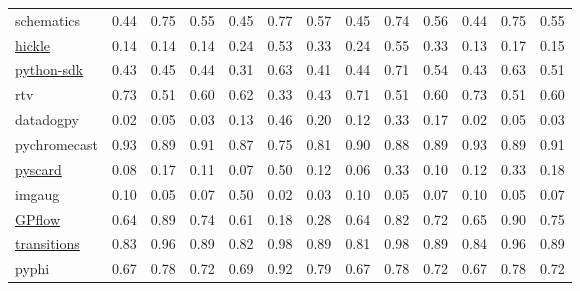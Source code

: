 \documentclass[submit]{ipsj}
\begin{document}
\begin{table}[t]
{\begin{tabular}{lcccccccccccc}
        schematics & 0.44 & 0.75 & 0.55 & 0.45 & 0.77 & 0.57 & 0.45 & 0.74 & 0.56 & 0.44 & 0.75 & 0.55 \\
        \underline{hickle} & 0.14 & 0.14 & 0.14 & 0.24 & 0.53 & 0.33 & 0.24 & 0.55 & 0.33 & 0.13 & 0.17 & 0.15 \\
        \underline{python-sdk} & 0.43 & 0.45 & 0.44 & 0.31 & 0.63 & 0.41 & 0.44 & 0.71 & 0.54 & 0.43 & 0.63 & 0.51 \\
        rtv & 0.73 & 0.51 & 0.60 & 0.62 & 0.33 & 0.43 & 0.71 & 0.51 & 0.60 & 0.73 & 0.51 & 0.60 \\
        datadogpy & 0.02 & 0.05 & 0.03 & 0.13 & 0.46 & 0.20 & 0.12 & 0.33 & 0.17 & 0.02 & 0.05 & 0.03 \\
        pychromecast & 0.93 & 0.89 & 0.91 & 0.87 & 0.75 & 0.81 & 0.90 & 0.88 & 0.89 & 0.93 & 0.89 & 0.91 \\
        \underline{pyscard} & 0.08 & 0.17 & 0.11 & 0.07 & 0.50 & 0.12 & 0.06 & 0.33 & 0.10 & 0.12 & 0.33 & 0.18 \\
        imgaug & 0.10 & 0.05 & 0.07 & 0.50 & 0.02 & 0.03 & 0.10 & 0.05 & 0.07 & 0.10 & 0.05 & 0.07 \\
        \underline{GPflow} & 0.64 & 0.89 & 0.74 & 0.61 & 0.18 & 0.28 & 0.64 & 0.82 & 0.72 & 0.65 & 0.90 & 0.75 \\
        \underline{transitions} & 0.83 & 0.96 & 0.89 & 0.82 & 0.98 & 0.89 & 0.81 & 0.98 & 0.89 & 0.84 & 0.96 & 0.89 \\
        pyphi & 0.67 & 0.78 & 0.72 & 0.69 & 0.92 & 0.79 & 0.67 & 0.78 & 0.72 & 0.67 & 0.78 & 0.72 \\
    \bottomrule
  \end{tabular}
  }
\end{table}
\end{document}
